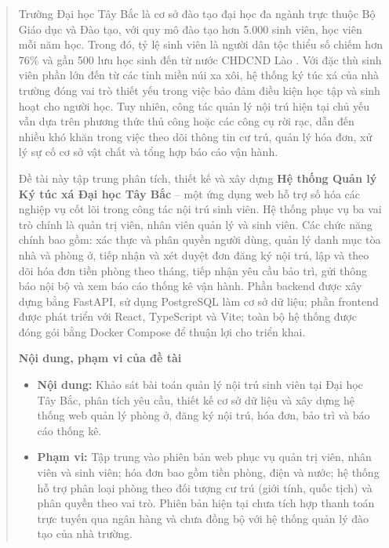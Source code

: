 \documentclass[12pt]{article}
\begin{document}
	\begin{abstract}
    \pagestyle{fancy}
    \fancyhf{}
    \fancyhead[R]{\thepage}
    \renewcommand{\headrulewidth}{0.4pt}

    Trường Đại học Tây Bắc là cơ sở đào tạo đại học đa ngành trực thuộc Bộ Giáo dục và Đào tạo, với quy mô đào tạo hơn 5.000 sinh viên, học viên mỗi năm học. Trong đó, tỷ lệ sinh viên là người dân tộc thiểu số chiếm hơn 76\% và gần 500 lưu học sinh đến từ nước CHDCND Lào \ci. Với đặc thù sinh viên phần lớn đến từ các tỉnh miền núi xa xôi, hệ thống ký túc xá của nhà trường đóng vai trò thiết yếu trong việc bảo đảm điều kiện học tập và sinh hoạt cho người học. Tuy nhiên, công tác quản lý nội trú hiện tại chủ yếu vẫn dựa trên phương thức thủ công hoặc các công cụ rời rạc, dẫn đến nhiều khó khăn trong việc theo dõi thông tin cư trú, quản lý hóa đơn, xử lý sự cố cơ sở vật chất và tổng hợp báo cáo vận hành.

    Đề tài này tập trung phân tích, thiết kế và xây dựng \textbf{Hệ thống Quản lý Ký túc xá Đại học Tây Bắc} -- một ứng dụng web hỗ trợ số hóa các nghiệp vụ cốt lõi trong công tác nội trú sinh viên. Hệ thống phục vụ ba vai trò chính là quản trị viên, nhân viên quản lý và sinh viên. Các chức năng chính bao gồm: xác thực và phân quyền người dùng, quản lý danh mục tòa nhà và phòng ở, tiếp nhận và xét duyệt đơn đăng ký nội trú, lập và theo dõi hóa đơn tiền phòng theo tháng, tiếp nhận yêu cầu bảo trì, gửi thông báo nội bộ và xem báo cáo thống kê vận hành. Phần backend được xây dựng bằng FastAPI, sử dụng PostgreSQL làm cơ sở dữ liệu; phần frontend được phát triển với React, TypeScript và Vite; toàn bộ hệ thống được đóng gói bằng Docker Compose để thuận lợi cho triển khai.

    \textbf{Nội dung, phạm vi của đề tài}
    \begin{itemize}
        \item \textbf{Nội dung:} Khảo sát bài toán quản lý nội trú sinh viên tại Đại học Tây Bắc, phân tích yêu cầu, thiết kế cơ sở dữ liệu và xây dựng hệ thống web quản lý phòng ở, đăng ký nội trú, hóa đơn, bảo trì và báo cáo thống kê.
        \item \textbf{Phạm vi:} Tập trung vào phiên bản web phục vụ quản trị viên, nhân viên và sinh viên; hóa đơn bao gồm tiền phòng, điện và nước; hệ thống hỗ trợ phân loại phòng theo đối tượng cư trú (giới tính, quốc tịch) và phân quyền theo vai trò. Phiên bản hiện tại chưa tích hợp thanh toán trực tuyến qua ngân hàng và chưa đồng bộ với hệ thống quản lý đào tạo của nhà trường.
    \end{itemize}
\end{abstract}
	
\end{document}
